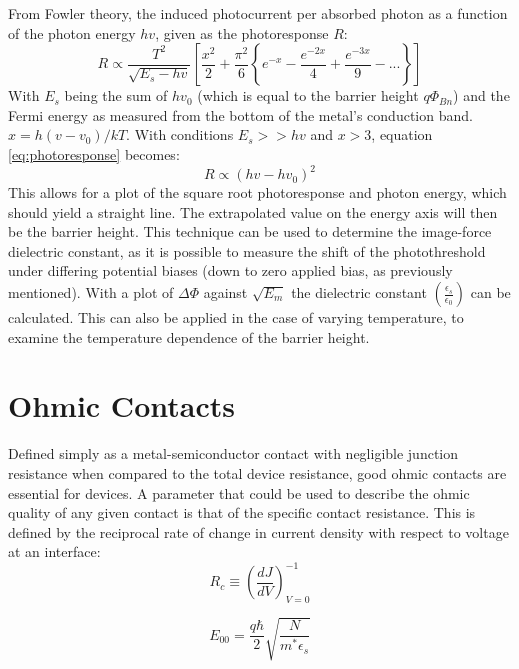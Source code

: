 From Fowler theory, the induced photocurrent per absorbed photon as a function of the photon energy $hv$, given as the photoresponse $R$:
\begin{equation}
	R\propto\frac{T^{2}}{\sqrt{E_{s}-hv}}\left[\frac{x^{2}}{2}+\frac{\pi^{2}}{6}\left\{e^{-x}-\frac{e^{-2x}}{4}+\frac{e^{-3x}}{9}-...\right\}\right]
	\label{eq:photoresponse}
\end{equation}
With $E_{s}$ being the sum of $hv_{0}$ (which is equal to the barrier height $q\Phi_{Bn}$) and the Fermi energy as measured from the bottom of the metal's conduction band. $x=h\left(v-v_{0}\right)/kT$. With conditions $E_{s}>>hv$ and $x>3$, equation \ref{eq:photoresponse} becomes:
\begin{equation}
	R\propto\left(hv-hv_{0}\right)^{2}
	\label{eq:photoresponse_simplified}
\end{equation}
This allows for a plot of the square root photoresponse and photon energy, which should yield a straight line. The extrapolated value on the energy axis will then be the barrier height. This technique can be used to determine the image-force dielectric constant, as it is possible to measure the shift of the photothreshold under differing potential biases (down to zero applied bias, as previously mentioned). With a plot of $\Delta\Phi$ against $\sqrt{E_{m}}$ the dielectric constant $\left(\frac{\epsilon_{s}}{\epsilon_{0}}\right)$ can be calculated. This can also be applied in the case of varying temperature, to examine the temperature dependence of the barrier height.

\section{Ohmic Contacts}
\label{sec:ohmic_contacts}
Defined simply as a metal-semiconductor contact with negligible junction resistance when compared to the total device resistance, good ohmic contacts are essential for devices. A parameter that could be used to describe the ohmic quality of any given contact is that of the specific contact resistance. This is defined by the reciprocal rate of change in current density with respect to voltage at an interface:
\begin{equation}
	R_{c}\equiv\left(\frac{dJ}{dV}\right)^{-1}_{V=0}
	\label{eq:sze_specific_contact_resistance}
\end{equation}

\begin{equation}
	E_{00} = \frac{q\hbar}{2}\sqrt{\frac{N}{m^{*}\epsilon_{s}}}
	\label{eq:E00_definition}
\end{equation}

